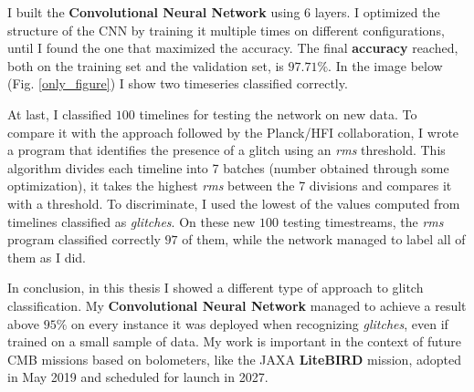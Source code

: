 \documentclass[12pt,a4paper,final]{report}			%
\begin{document}
	I built the \textbf{Convolutional Neural Network} using 6 layers. I optimized the structure of the CNN by training it multiple times on different configurations, until I found the one that maximized the accuracy. The final \textbf{accuracy} reached, both on the training set and the validation set, is $97.71\%$. In the image below (Fig. \ref{only_figure}) I show two timeseries classified correctly.
	
	At last, I classified $100$ timelines for testing the network on new data. To compare it with the approach followed by the Planck/HFI collaboration, I wrote a program that identifies the presence of a glitch using an \textit{rms} threshold. 
	This algorithm divides each timeline into 7 batches (number obtained through some optimization), it takes the highest \textit{rms} between the 7 divisions and compares it with a threshold. 
	To discriminate, I used the lowest of the values computed from timelines classified as \textit{glitches}. 
	On these new $100$ testing timestreams, the \textit{rms} program classified correctly $97$ of them, while the network managed to label all of them as I did.
	
	In conclusion, in this thesis I showed a different type of approach to glitch classification. My \textbf{Convolutional Neural Network} managed to achieve a result above $95\%$ on every instance it was deployed when recognizing \textit{glitches}, even if trained on a small sample of data. My work is important in the context of future CMB missions based on bolometers, like the JAXA \textbf{LiteBIRD }mission, adopted in May 2019 and scheduled for launch in 2027.
	
\end{document}
